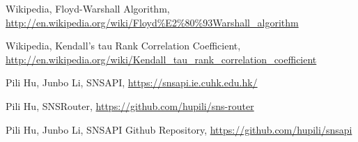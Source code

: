 	Wikipedia, Floyd-Warshall Algorithm, 
	\url{http://en.wikipedia.org/wiki/Floyd%E2%80%93Warshall_algorithm}

	Wikipedia, Kendall's tau Rank Correlation Coefficient,
	\url{http://en.wikipedia.org/wiki/Kendall_tau_rank_correlation_coefficient}

	Pili Hu, Junbo Li, SNSAPI, \url{https://snsapi.ie.cuhk.edu.hk/}

	Pili Hu, SNSRouter, \url{https://github.com/hupili/sns-router}

	Pili Hu, Junbo Li, SNSAPI Github Repository, \url{https://github.com/hupili/snsapi}
